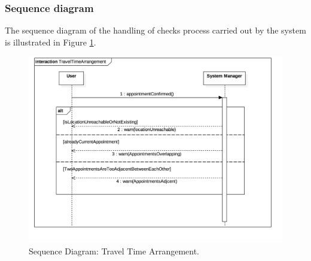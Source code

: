 \subsubsection{Sequence diagram}
The sequence diagram of the handling of checks process carried out by the system is illustrated in Figure \ref{fig:TravelTime}.
\begin{figure}
	\centering
	\includegraphics[width=6in]{./diagrams/TravelTimeArrangement.png}
	\caption{Sequence Diagram: Travel Time Arrangement.}
	\label{fig:TravelTime}
\end{figure}

